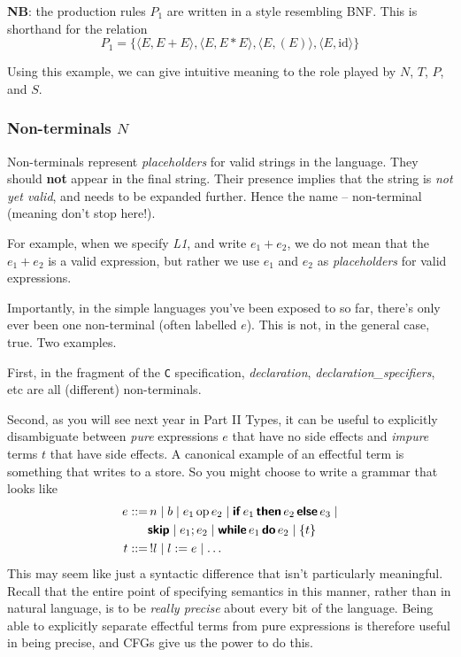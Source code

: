 \textbf{NB}: the production rules $P_1$ are written in a style resembling BNF. This is shorthand for the relation
\[P_1 = \{\langle E, E + E \rangle, \langle E, E * E \rangle, \langle E, (E) \rangle, \langle E, \text{id} \rangle\}\]

Using this example, we can give intuitive meaning to the role played by $N$, $T$, $P$, and $S$.

\subsubsection{Non-terminals $N$}
Non-terminals represent \textit{placeholders} for valid strings in the language. They should \textbf{not} appear in the final string. Their presence implies that the string is \textit{not yet valid}, and needs to be expanded further. Hence the name -- non-terminal (meaning don't stop here!). 
    
For example, when we specify \textit{L1}, and write $e_1 + e_2$, we do not mean that the $e_1 + e_2$ is a valid expression, but rather we use $e_1$ and $e_2$ as \textit{placeholders} for valid expressions.

Importantly, in the simple languages you've been exposed to so far, there's only ever been one non-terminal (often labelled $e$). This is not, in the general case, true. Two examples. 

First, in the fragment of the \texttt{C} specification, \textit{declaration}, \textit{declaration\_specifiers}, etc are all (different) non-terminals.

Second, as you will see next year in \textsf{Part II Types}, it can be useful to explicitly disambiguate between \textit{pure} expressions $e$ that have no side effects and \textit{impure} terms $t$ that have side effects. A canonical example of an effectful term is something that writes to a store. So you might choose to write a grammar that looks like
\begin{align*}
    e ::=& \, n \mid b \mid e_1 \, \text{op} \, e_2 \mid \textbf{\textsf{if}} \, e_1 \, \textbf{\textsf{then}} \, e_2 \, \textbf{\textsf{else}} \, e_3 \mid \\
    & \textbf{\textsf{skip}} \mid e_1 ; e_2 \mid \textbf{\textsf{while}} \, e_1 \, \textbf{\textsf{do}} \, e_2 \mid \{ t \} \\
    t ::= & \, !l \mid l := e \mid \ldots
\end{align*}
This may seem like just a syntactic difference that isn't particularly meaningful. Recall that the entire point of specifying semantics in this manner, rather than in natural language, is to be \textit{really precise} about every bit of the language. Being able to explicitly separate effectful terms from pure expressions is therefore useful in being precise, and CFGs give us the power to do this.

